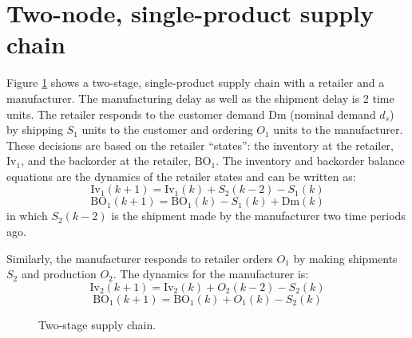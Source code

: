 \documentclass{elsarticle}
\newcommand{\BO}{\textrm{BO}}
\newcommand{\Inv}{\textrm{Iv}}
\newcommand{\Dem}{\textrm{Dm}}
\theoremstyle{definition}
\begin{document}
\section{Two-node, single-product supply chain}
\label{sec:model}
Figure \ref{fig:2stage} shows a two-stage, single-product supply chain with a retailer
and a manufacturer. The manufacturing delay as well as the shipment
delay is 2 time units. The retailer responds to the customer demand
$\Dem$ (nominal demand $d_s$) by shipping $S_1$ units to the customer and
ordering $O_1$ units to the manufacturer. These decisions are based on
the retailer ``states'': the inventory at the retailer, $\Inv_1$,  and the
backorder at the retailer, $\BO_1$. The inventory and backorder
balance equations are the dynamics of the retailer states and can be
written as:
\[ \Inv_1(k+1) = \Inv_1(k) + S_2(k-2) -S_1(k) \]
\[ \BO_1(k+1) = \BO_1(k) -S_1(k) + \Dem(k) \]
in which $S_2(k-2)$ is the shipment made by the manufacturer two time
periods ago. 

Similarly, the manufacturer responds to retailer orders $O_1$ by
making shipments $S_2$ and production $O_2$. The dynamics for the
manufacturer is:
\[ \Inv_2(k+1) = \Inv_2(k) + O_2(k-2) - S_2(k) \]
\[ \BO_1(k+1)  = \BO_1(k) + O_1(k) - S_2(k) \]

\begin{figure}
\centering
{\resizebox{0.9\textwidth}{!}{}}
\caption{Two-stage supply chain.}
\label{fig:2stage}
\end{figure}
\end{document}
